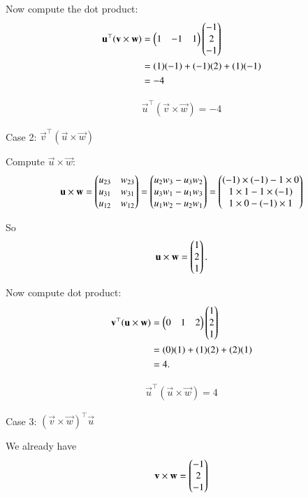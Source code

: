 \documentclass[journal]{IEEEtran}
\begin{document}
Now compute the dot product:
\begin{align}
\mathbf{u} ^\top (\mathbf{v}\times \mathbf{w}) &= \begin{pmatrix}1 & -1 & 1\end{pmatrix}\begin{pmatrix}-1 \\ 2 \\ -1\end{pmatrix} \\
&= (1)(-1) + (-1)(2) + (1)(-1) \\
&= -4
\end{align}

\begin{align}
\boxed{\vec{u}^\top(\vec{v}\times \vec{w}) = -4}
\end{align}

Case 2: $\vec{v} ^\top (\vec{u} \times \vec{w})$

Compute $\vec{u} \times \vec{w}$:
\begin{align}
\mathbf{u} \times \mathbf{w} =
\begin{pmatrix}
u_{23} & w_{23} \\
u_{31} & w_{31} \\
u_{12} & w_{12}
\end{pmatrix}
=
\begin{pmatrix}
u_2 w_3 - u_3 w_2 \\
u_3 w_1 - u_1 w_3 \\
u_1 w_2 - u_2 w_1
\end{pmatrix}
=
\begin{pmatrix}
(-1) \times (-1) - 1 \times 0 \\
1 \times 1 - 1 \times (-1) \\
1 \times 0 - (-1) \times 1
\end{pmatrix}
\end{align}

So
\begin{align}
\mathbf{u}\times \mathbf{w} = \begin{pmatrix}1 \\ 2 \\ 1\end{pmatrix}.
\end{align}

Now compute dot product:
\begin{align}
\mathbf{v}^\top(\mathbf{u}\times \mathbf{w}) &= \begin{pmatrix}0 & 1 & 2\end{pmatrix}\begin{pmatrix}1 \\ 2 \\ 1\end{pmatrix} \\
&= (0)(1) + (1)(2) + (2)(1) \\
&= 4.
\end{align}

\begin{align}
\boxed{\vec{u}^\top(\vec{u}\times \vec{w}) = 4}
\end{align}

Case 3: $(\vec{v} \times \vec{w}) ^\top \vec{u}$

We already have
\begin{align}
\mathbf{v}\times \mathbf{w} = \begin{pmatrix}-1 \\ 2 \\ -1\end{pmatrix}
\end{align}
\end{document}
